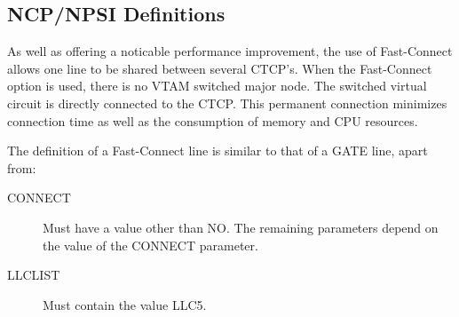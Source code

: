 \documentclass[letterpaper,10pt,english]{sphinxmanual}
\begin{document}

\subsection{NCP/NPSI Definitions}
\label{\detokenize{connectivity_guide:ncp-npsi-definitions}}\label{\detokenize{connectivity_guide:index-72}}
As well as offering a noticable performance improvement, the use of Fast-Connect allows one line to be shared between several CTCP’s. When the Fast-Connect option is used, there is no VTAM switched major node. The switched virtual circuit is directly connected to the CTCP. This permanent connection minimizes connection time as well as the consumption of memory and CPU resources.

The definition of a Fast-Connect line is similar to that of a GATE line, apart from:

\begin{description}
\item[{CONNECT}] \leavevmode
Must have a value other than NO. The remaining parameters depend on
the value of the CONNECT parameter.

\item[{LLCLIST}] \leavevmode
Must contain the value LLC5.

\end{description}

\end{document}
